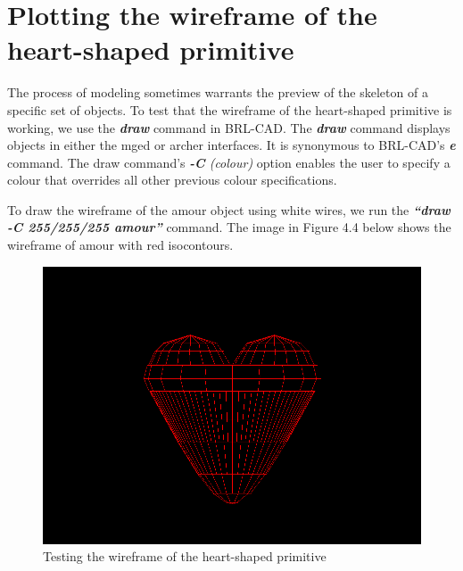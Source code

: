 \section{Plotting the wireframe of the heart­-shaped primitive}

\hspace{30} The   process   of   modeling   sometimes   warrants   the   preview   of   the   skeleton  
of   a   specific   set   of   objects.   To   test   that   the   wireframe   of   the   heart­-shaped  
primitive   is   working,   we   use   the   \textit{\textbf{draw}} \cite{40}   command   in   BRL­-CAD.   The   \textit{\textbf{draw}}  
command   displays   objects   in   either   the   mged   or   archer   interfaces.   It   is  
synonymous   to   BRL­-CAD's   \textit{\textbf{e}}   command.   The   draw   command's   \textit{\textbf{-­C} (colour)}  
option   enables   the   user   to   specify   a   colour   that   overrides   all   other   previous  
colour specifications.  

\hspace{30} To   draw   the   wireframe   of   the   amour   object   using   white   wires,   we   run   the  
\textit{\textbf{“draw -­C 255/255/255 amour”}}   command.   The   image   in   Figure   4.4   below   shows  
the wireframe of amour with red iso­contours.  

\begin{figure}[htbp]
\centering
\includegraphics[trim=0.0cm 0.5cm 0.1cm 0.1cm, clip=true, totalheight=0.4\textheight]{Pictures/Wireframe.png}
\caption[Testing the wireframe of the heart­-shaped primitive]{Testing the wireframe of the heart­-shaped primitive}
\label{Wireframe}
\end{figure}


